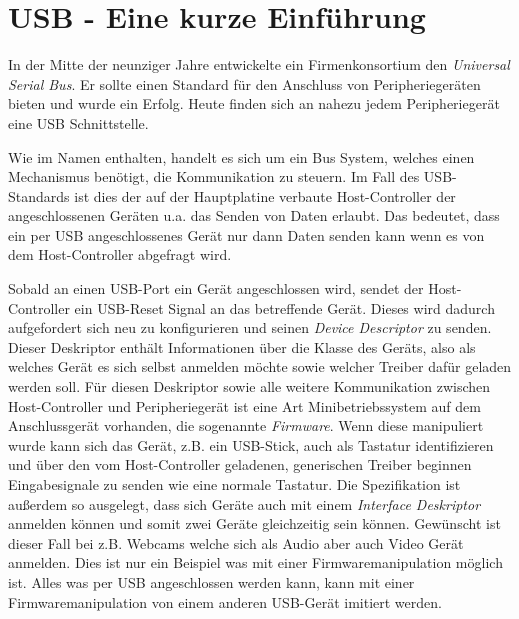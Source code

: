 \section{USB - Eine kurze Einführung}
In der Mitte der neunziger Jahre entwickelte ein Firmenkonsortium den \textit{Universal Serial Bus}.
Er sollte einen Standard für den Anschluss von Peripheriegeräten bieten und wurde ein Erfolg.
Heute finden sich an nahezu jedem Peripheriegerät eine USB Schnittstelle.

Wie im Namen enthalten, handelt es sich um ein Bus System, welches einen Mechanismus benötigt, die Kommunikation zu steuern. Im Fall des USB-Standards ist dies der auf der Hauptplatine verbaute Host-Controller der angeschlossenen Geräten u.a. das Senden von Daten erlaubt. Das bedeutet, dass ein per USB angeschlossenes Gerät nur dann Daten senden kann wenn es von dem Host-Controller abgefragt wird.

Sobald an einen USB-Port ein Gerät angeschlossen wird, sendet der Host-Controller ein USB-Reset Signal an das betreffende Gerät. Dieses wird dadurch aufgefordert sich neu zu konfigurieren und seinen \textit{Device Descriptor} zu senden.
Dieser Deskriptor enthält Informationen über die Klasse des Geräts, also als welches Gerät es sich selbst anmelden möchte sowie welcher Treiber dafür geladen werden soll. Für diesen Deskriptor sowie alle weitere Kommunikation zwischen Host-Controller und Peripheriegerät ist eine Art Minibetriebssystem auf dem Anschlussgerät vorhanden, die sogenannte \textit{Firmware}. Wenn diese manipuliert wurde kann sich das Gerät, z.B. ein USB-Stick, auch als Tastatur identifizieren und über den vom Host-Controller geladenen, generischen Treiber beginnen Eingabesignale zu senden wie eine normale Tastatur. Die Spezifikation ist außerdem so ausgelegt, dass sich Geräte auch mit einem \textit{Interface Deskriptor} anmelden können und somit zwei Geräte gleichzeitig sein können. Gewünscht ist dieser Fall bei z.B. Webcams welche sich als Audio aber auch Video Gerät anmelden. Dies ist nur ein Beispiel was mit einer Firmwaremanipulation möglich ist.
Alles was per USB angeschlossen werden kann, kann mit einer Firmwaremanipulation von einem anderen USB-Gerät imitiert werden.
